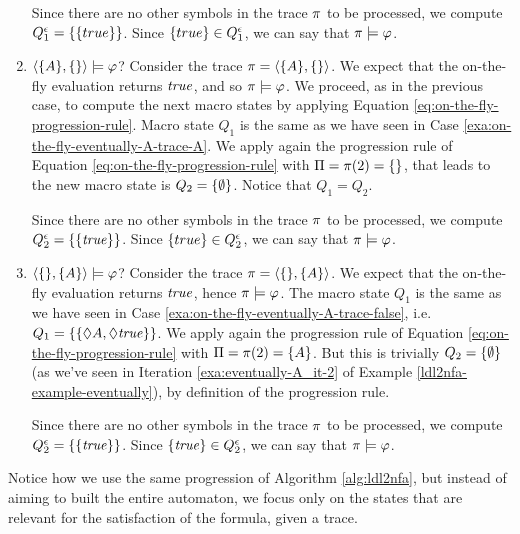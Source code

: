 \begin{example}
\begin{enumerate}
		Since there are no other symbols in the trace $\pi$ to be processed, we compute $Q_1^\epsilon = \{\{true\}\}$. Since $\{true\} \in Q_1^\epsilon$, we can say that $\pi \models \varphi$.\label{exa:on-the-fly-eventually-A-trace-A}
		
		\item $\langle \{A\}, \{\} \rangle \models \varphi$? Consider the trace $\pi = \langle \{A\}, \{\} \rangle$. We expect that the on-the-fly evaluation returns $\mathit{true}$, and so $\pi \models \varphi$. We proceed, as in the previous case, to compute the next macro states by applying Equation \ref{eq:on-the-fly-progression-rule}. Macro state $Q_1$ is the same as we have seen in Case \ref{exa:on-the-fly-eventually-A-trace-A}. 
		We apply again the progression rule of Equation \ref{eq:on-the-fly-progression-rule} with $\Pi = \pi(2) = \{\}$, that leads to the new macro state is $Q_2 = \{\emptyset\}$. Notice that $Q_1 = Q_2$.
		
		Since there are no other symbols in the trace $\pi$ to be processed, we compute $Q_2^\epsilon = \{\{\mathit{true}\}\}$. Since $\{true\} \in Q_2^\epsilon$, we can say that $\pi \models \varphi$.
		
		\item \label{exa:on-the-fly-eventually-A-trace-false-A}$\langle \{\}, \{A\} \rangle \models \varphi$? Consider the trace $\pi = \langle \{\}, \{A\} \rangle$. We expect that the on-the-fly evaluation returns $\mathit{true}$, hence $\pi \models \varphi$. The macro state $Q_1$ is the same as we have seen in Case \ref{exa:on-the-fly-eventually-A-trace-false}, i.e. $Q_1 = \{\{\Diamond A, \Diamond \mathit{true}\}\}$. 
		We apply again the progression rule of Equation \ref{eq:on-the-fly-progression-rule} with $\Pi = \pi(2) = \{A\}$. But this is trivially $Q_2 = \{\emptyset\}$ (as we've seen in Iteration \ref{exa:eventually-A_it-2} of Example \ref{ldl2nfa-example-eventually}), by definition of the progression rule.
		
		Since there are no other symbols in the trace $\pi$ to be processed, we compute $Q_2^\epsilon = \{\{\mathit{true}\}\}$. Since $\{\mathit{true}\} \in Q_2^\epsilon$, we can say that $\pi \models \varphi$.
		
	\end{enumerate}	
	Notice how we use the same progression  of Algorithm \ref{alg:ldl2nfa}, but instead of aiming to built the entire automaton, we focus only on the states that are relevant for the satisfaction of the formula, given a trace.
	
\end{example}

